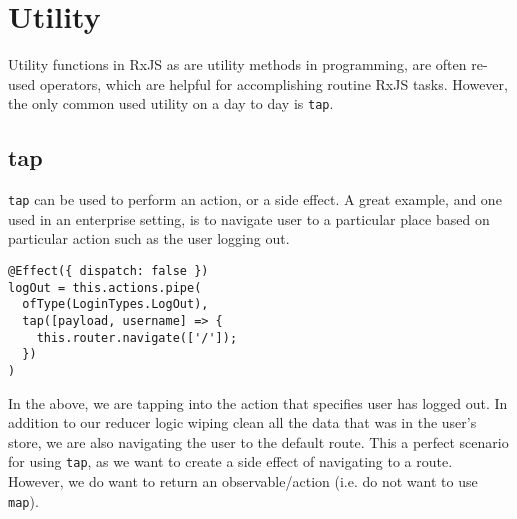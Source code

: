 \chapter{Utility}
Utility functions in RxJS as are utility methods in programming, are often re-used operators, which are helpful for accomplishing routine RxJS tasks. However, the only common used utility on a day to day is \lstinline{tap}.

\section{tap}
\lstinline{tap} can be used to perform an action, or a side effect. A great example, and one used in an enterprise setting, is to navigate user to a particular place based on particular action such as the user logging out. 

\begin{lstlisting}[caption=login.effects.ts]
@Effect({ dispatch: false })
logOut = this.actions.pipe(
  ofType(LoginTypes.LogOut),
  tap([payload, username] => {
    this.router.navigate(['/']);
  })
)  
\end{lstlisting}

In the above, we are tapping into the action that specifies user has logged out. In addition to our reducer logic wiping clean all the data that was in the user's store, we are also navigating the user to the default route. This a perfect scenario for using \lstinline{tap}, as we want to create a side effect of navigating to a route. However, we do want to return an observable/action (i.e. do not want to use \lstinline{map}).  
